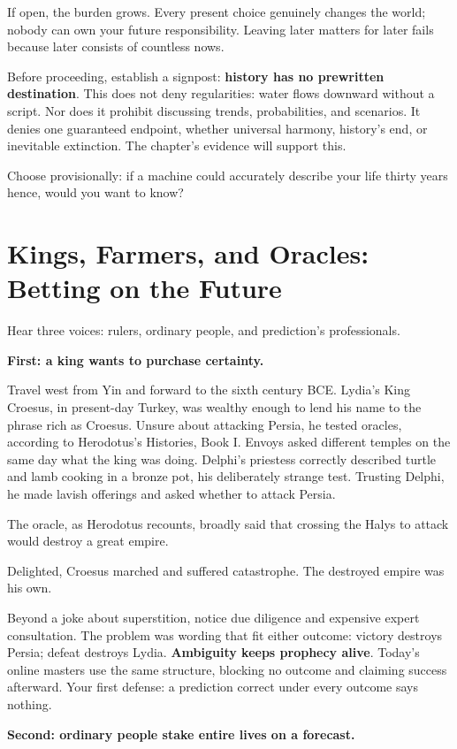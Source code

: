 If open, the burden grows. Every present choice genuinely changes the world; nobody can own your future responsibility. Leaving later matters for later fails because later consists of countless nows.

Before proceeding, establish a signpost: \textbf{history has no prewritten destination}. This does not deny regularities: water flows downward without a script. Nor does it prohibit discussing trends, probabilities, and scenarios. It denies one guaranteed endpoint, whether universal harmony, history's end, or inevitable extinction. The chapter's evidence will support this.

Choose provisionally: if a machine could accurately describe your life thirty years hence, would you want to know?

\section[Kings, Farmers, Oracles, and the Future]{Kings, Farmers, and Oracles: Betting on the Future}
Hear three voices: rulers, ordinary people, and prediction's professionals.

\textbf{First: a king wants to purchase certainty.}

Travel west from Yin and forward to the sixth century BCE. Lydia's King Croesus, in present-day Turkey, was wealthy enough to lend his name to the phrase rich as Croesus. Unsure about attacking Persia, he tested oracles, according to Herodotus's Histories, Book I. Envoys asked different temples on the same day what the king was doing. Delphi's priestess correctly described turtle and lamb cooking in a bronze pot, his deliberately strange test. Trusting Delphi, he made lavish offerings and asked whether to attack Persia.

The oracle, as Herodotus recounts, broadly said that crossing the Halys to attack would destroy a great empire.

Delighted, Croesus marched and suffered catastrophe. The destroyed empire was his own.

Beyond a joke about superstition, notice due diligence and expensive expert consultation. The problem was wording that fit either outcome: victory destroys Persia; defeat destroys Lydia. \textbf{Ambiguity keeps prophecy alive}. Today's online masters use the same structure, blocking no outcome and claiming success afterward. Your first defense: a prediction correct under every outcome says nothing.

\textbf{Second: ordinary people stake entire lives on a forecast.}

